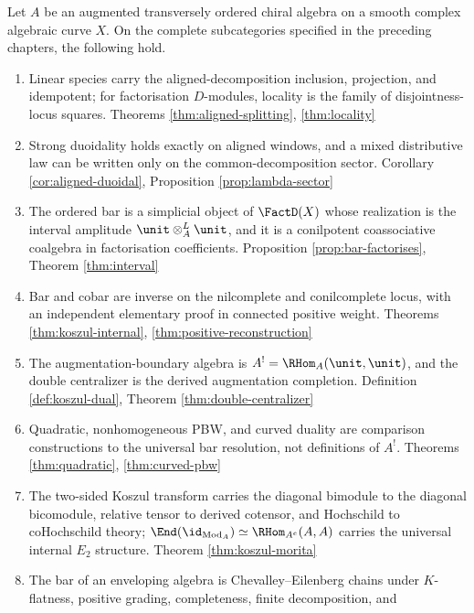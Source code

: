 \begin{maintheorem}
\label{thm:structure}
Let $A$ be an augmented transversely ordered chiral algebra on a smooth
complex algebraic curve $X$. On the complete subcategories specified in
the preceding chapters, the following hold.
\begin{enumerate}
\item Linear species carry the aligned-decomposition inclusion,
  projection, and idempotent; for factorisation $D$-modules, locality is
  the family of disjointness-locus squares.
  \hfill{\small Theorems \ref{thm:aligned-splitting}, \ref{thm:locality}}
\item Strong duoidality holds exactly on aligned windows, and a mixed
  distributive law can be written only on the common-decomposition sector.
  \hfill{\small Corollary \ref{cor:aligned-duoidal},
  Proposition \ref{prop:lambda-sector}}
\item The ordered bar is a simplicial object of $\FactD(X)$ whose
  realization is the interval amplitude $\unit\otimes^L_A\unit$, and it is
  a conilpotent coassociative coalgebra in factorisation coefficients.
  \hfill{\small Proposition \ref{prop:bar-factorises},
  Theorem \ref{thm:interval}}
\item Bar and cobar are inverse on the nilcomplete and conilcomplete
  locus, with an independent elementary proof in connected positive weight.
  \hfill{\small Theorems \ref{thm:koszul-internal},
  \ref{thm:positive-reconstruction}}
\item The augmentation-boundary algebra is $A^!=\RHom_A(\unit,\unit)$, and
  the double centralizer is the derived augmentation completion.
  \hfill{\small Definition \ref{def:koszul-dual},
  Theorem \ref{thm:double-centralizer}}
\item Quadratic, nonhomogeneous PBW, and curved duality are comparison
  constructions to the universal bar resolution, not definitions of $A^!$.
  \hfill{\small Theorems \ref{thm:quadratic}, \ref{thm:curved-pbw}}
\item The two-sided Koszul transform carries the diagonal bimodule to the
  diagonal bicomodule, relative tensor to derived cotensor, and Hochschild
  to coHochschild theory; $\End(\id_{\mathrm{Mod}_A})\simeq
  \RHom_{A^e}(A,A)$ carries the universal internal $E_2$ structure.
  \hfill{\small Theorem \ref{thm:koszul-morita}}
\item The bar of an enveloping algebra is Chevalley--Eilenberg chains under
  $K$-flatness, positive grading, completeness, finite decomposition, and

\end{enumerate}
\end{maintheorem}

